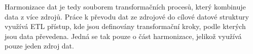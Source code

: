Harmonizace dat je tedy souborem transformačních procesů, který kombinuje data z více zdrojů. Práce k převodu dat ze zdrojové do cílové datové struktury využívá ETL přístup, kde jsou definovány transformační kroky, podle kterých jsou data převedena. Jedná se tak pouze o část harmonizace, jelikož využívá pouze jeden zdroj dat.  


















